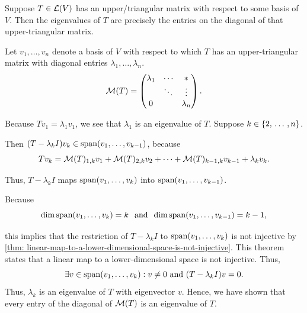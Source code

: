 \begin{thm}
  \label{thm:determination-of-eigenvalue-from-upper-triangular-matrix}
  Suppose $T\in \mathcal{L}(V)$ has an upper\-/triangular matrix with respect to some basis of $V$. Then the eigenvalues of $T$ are precisely the entries on the diagonal of that upper-triangular matrix.

\end{thm}
\begin{prf}
  Let $v_1, \ldots, v_n$ denote a basis of $V$ with respect to which $T$ has an upper-triangular matrix with diagonal entries $\lambda_1, \ldots, \lambda_n$.
  \begin{equation}
    \mathcal{M}(T) =
    \begin{pmatrix}
        \lambda_1 &  \cdots       &  * \\
                  &  \ddots & \vdots   \\
           0      &         & \lambda_n
    \end{pmatrix}.
  \end{equation}

  Because $T v_1 = \lambda_1 v_1$, we see that $\lambda_1$ is an eigenvalue of $T$.
  Suppose $k \in \{2, {\, \ldots \,\,}, n\}$.

  Then $(T-\lambda_k I) v_k \in \operatorname{span} (v_1, \ldots, v_{k-1})$, because
  \begin{equation}
    T v_k = \mathcal{M}(T)_{1,k} v_1 + \mathcal{M}(T)_{2,k}v_2 + \cdots + \mathcal{M}(T)_{k-1,k} v_{k-1} + \lambda_k v_k.
  \end{equation}

  Thus, $T-\lambda_k I$ maps $\operatorname{span} (v_1, \ldots, v_k)$ into $\operatorname{span} (v_1, \ldots, v_{k-1})$.

  Because
  \begin{equation}
    \dim \operatorname{span} (v_1, \ldots, v_k) = k \;\;\, \text{and}\;\; \dim \operatorname{span} (v_1, \ldots, v_{k-1}) = k-1,
  \end{equation}

  this implies that the restriction of $T-\lambda_k I$ to $\operatorname{span} (v_1, \ldots, v_k)$ is not injective by \ref{thm: linear-map-to-a-lower-dimensional-space-is-not-injective}. This theorem states that a linear map to a lower-dimensional space is not injective. Thus,
  \begin{equation}
    \exists v \in \operatorname{span} (v_1, \ldots, v_k): v\neq 0 \text{ and } (T-\lambda_k I)v=0.
  \end{equation}
  Thus, $\lambda_k$ is an eigenvalue of $T$ with eigenvector $v$. Hence, we have shown that every entry of the diagonal of $\mathcal{M}(T)$ is an eigenvalue of $T$.


\end{prf}
